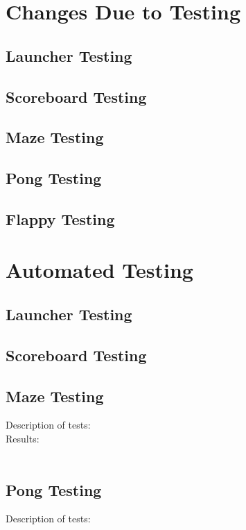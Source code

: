 \documentclass[12pt, titlepage]{article}
\begin{document}
\section{Changes Due to Testing}

	\subsection{Launcher Testing}

	\subsection{Scoreboard Testing}

	\subsection{Maze Testing}
	
	\subsection{Pong Testing}
	
	\subsection{Flappy Testing}

\section{Automated Testing}	

	\subsection{Launcher Testing}
	
	\subsection{Scoreboard Testing}
		
	\subsection{Maze Testing}
		Description of tests: \\
		
		Results: \\ \\
		
	\subsection{Pong Testing}
		Description of tests: \\
		
\end{document}

